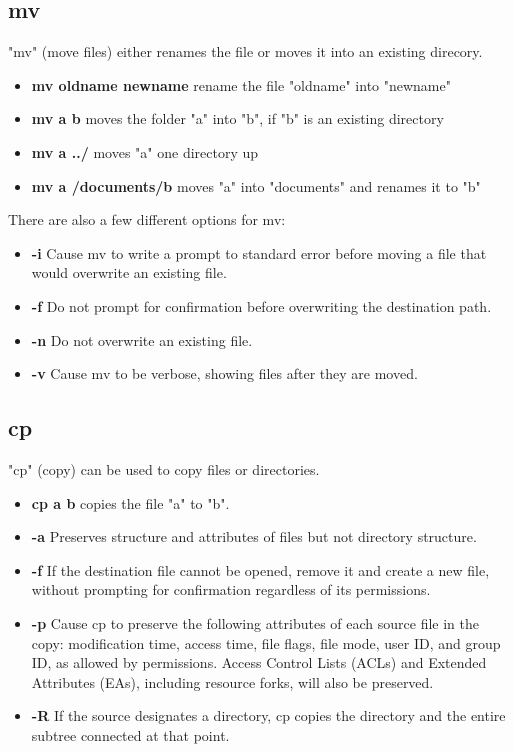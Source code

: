 \documentclass[10pt,a4paper]{scrartcl}
\begin{document}
\begin{description}
\subsection{mv}
"mv" (move files) either renames the file or moves it into an existing direcory.
\begin{doublespacing}
\begin{itemize}
\item{\bf{mv oldname newname}} \qquad rename the file "oldname" into "newname"
\item{\bf{mv a b}} \qquad moves the folder "a" into "b", if "b" is an existing directory
\item{\bf{mv a ../}} \qquad moves "a" one directory up
\item{\bf{mv a /documents/b}} \qquad moves "a" into "documents" and renames it to "b"
\end{itemize}
There are also a few different options for mv:
\begin{itemize}
\item{\bf{-i}} \qquad  Cause mv to write a prompt to standard error before moving a file that would overwrite an existing file.
\item{\bf{-f}} \qquad Do not prompt for confirmation before overwriting the destination path.
\item{\bf{-n}} \qquad Do not overwrite an existing file.
\item{\bf{-v}} \qquad  Cause mv to be verbose, showing files after they are moved.
\end{itemize}
\end{doublespacing}

\subsection{cp}
"cp" (copy) can be used to copy files or directories.
\begin{doublespacing}
\begin{itemize}
\item{\bf{cp a b}} \qquad copies the file "a" to "b".
\item{\bf{-a}} \qquad  Preserves structure and attributes of files
           but not directory structure.
\item{\bf{-f}} \qquad  If the destination file cannot be opened, remove it and create a
           new file, without prompting for confirmation regardless of its permissions.
\item{\bf{-p}} \qquad Cause cp to preserve the following attributes of each source file in the copy: modification time, access time, file flags, file mode,
           user ID, and group ID, as allowed by permissions.  Access Control
           Lists (ACLs) and Extended Attributes (EAs), including resource
           forks, will also be preserved.
\item{\bf{-R}} \qquad  If the source designates a directory, cp copies the directory and
           the entire subtree connected at that point.
\end{itemize}
\end{doublespacing}


\end{description}
\end{document}
